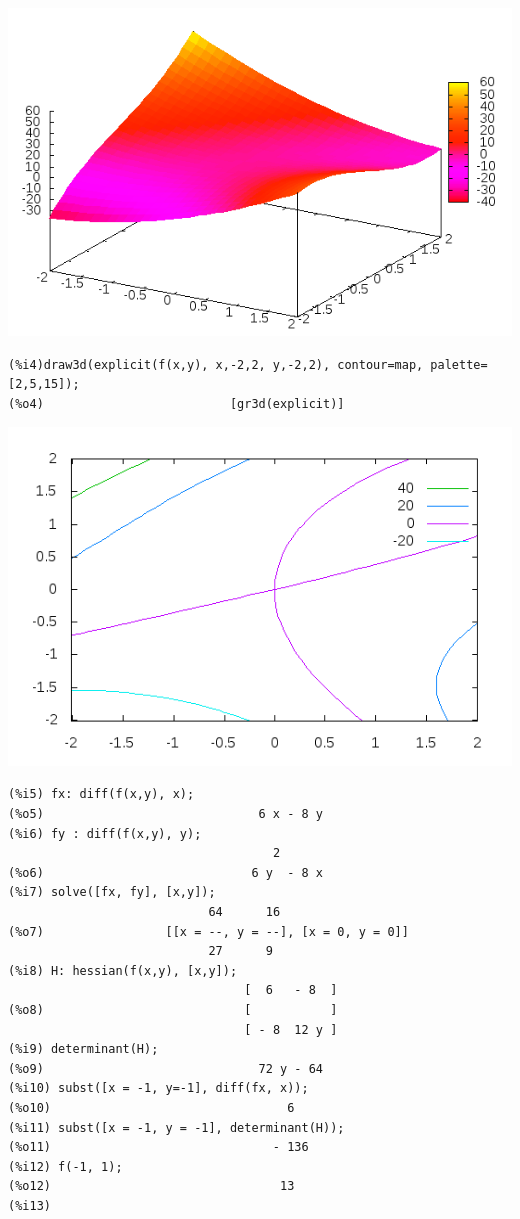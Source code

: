 \documentclass[12pt,letterpaper]{article}
\begin{document}
\begin{center}
\includegraphics[scale=0.6]{cosa1.png}
\end{center}

\begin{verbatim}
(%i4)draw3d(explicit(f(x,y), x,-2,2, y,-2,2), contour=map, palette=[2,5,15]);
(%o4)                          [gr3d(explicit)]
\end{verbatim}
\begin{center}
\includegraphics[scale=0.6]{cosa2.png}
\end{center}

\begin{verbatim}
(%i5) fx: diff(f(x,y), x);
(%o5)                              6 x - 8 y
(%i6) fy : diff(f(x,y), y);
                                     2
(%o6)                             6 y  - 8 x
(%i7) solve([fx, fy], [x,y]);
                            64      16
(%o7)                 [[x = --, y = --], [x = 0, y = 0]]
                            27      9
(%i8) H: hessian(f(x,y), [x,y]);
                                 [  6   - 8  ]
(%o8)                            [           ]
                                 [ - 8  12 y ]
(%i9) determinant(H);
(%o9)                              72 y - 64
(%i10) subst([x = -1, y=-1], diff(fx, x));
(%o10)                                 6
(%i11) subst([x = -1, y = -1], determinant(H));
(%o11)                               - 136
(%i12) f(-1, 1);
(%o12)                                13
(%i13) 
\end{verbatim}
\end{document}

